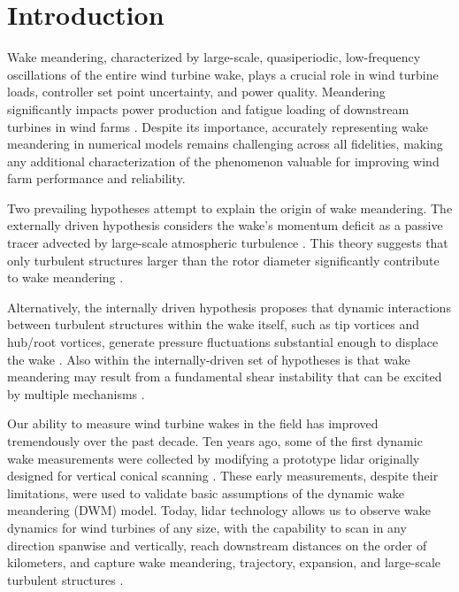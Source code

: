 \documentclass[%
 aip,
 amsmath,
 amssymb,
preprint,%
]{revtex4-2}
\begin{document}
\maketitle

\section{Introduction}
Wake meandering, characterized by large-scale, quasiperiodic, low-frequency oscillations of the entire wind turbine wake, plays a crucial role in wind turbine loads, controller set point uncertainty, and power quality. 
Meandering significantly impacts power production and fatigue loading of downstream turbines in wind farms \cite{larsen2008wake, brugger2020lidar, wiseWakeMeanderingEffects2020a}. 
Despite its importance, accurately representing wake meandering in numerical models remains challenging across all fidelities, making any additional characterization of the phenomenon valuable for improving wind farm performance and reliability.

Two prevailing hypotheses attempt to explain the origin of wake meandering. 
The externally driven hypothesis considers the wake's momentum deficit as a passive tracer advected by large-scale atmospheric turbulence \cite{larsen2008wake}. 
This theory suggests that only turbulent structures larger than the rotor diameter significantly contribute to wake meandering \cite{espana2012wind,baker1985wake, zambrano1983wake, larsen2007dynamic, larsen2008wake, jonkman2017development}. 

Alternatively, the internally driven hypothesis proposes that dynamic interactions between turbulent structures within the wake itself, such as tip vortices and hub/root vortices, generate pressure fluctuations substantial enough to displace the wake \cite{medici2008measurements, okulov2007stability, okulov2014regular, howard2015statistics, foti2016wake, foti2018wake}. Also within the internally-driven set of hypotheses is that wake meandering may result from a fundamental shear instability that can be excited by multiple mechanisms \cite{andersen2013simulation,liOnsetWakeMeandering2022}. 

Our ability to measure wind turbine wakes in the field has improved tremendously over the past decade. 
Ten years ago, some of the first dynamic wake measurements were collected by modifying a prototype lidar originally designed for vertical conical scanning \cite{bingol_light_2010, trujillo_light_2011}. 
These early measurements, despite their limitations, were used to validate basic assumptions of the dynamic wake meandering (DWM) model. 
Today, lidar technology allows us to observe wake dynamics for wind turbines of any size, with the capability to scan in any direction spanwise and vertically, reach downstream distances on the order of kilometers, and capture wake meandering, trajectory, expansion, and large-scale turbulent structures \cite{brugger2020lidar}.
\end{document}
